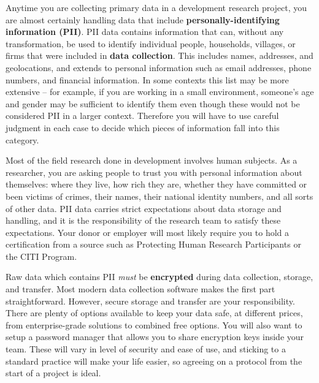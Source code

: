 Anytime you are collecting primary data in a development research project,
you are almost certainly handling data that include \textbf{personally-identifying information (PII)}.
PII data contains information that can, without any transformation, be used to identify
individual people, households, villages, or firms that were included in \textbf{data collection}.
This includes names, addresses, and geolocations, and extends to personal information
such as email addresses, phone numbers, and financial information.
In some contexts this list may be more extensive --
for example, if you are working in a small environment,
someone's age and gender may be sufficient to identify them
even though these would not be considered PII in a larger context.
Therefore you will have to use careful judgment in each case
to decide which pieces of information fall into this category.

Most of the field research done in development involves human subjects.
As a researcher, you are asking people to trust you with personal information about themselves:
where they live, how rich they are, whether they have committed or been victims of crimes,
their names, their national identity numbers, and all sorts of other data.
PII data carries strict expectations about data storage and handling,
and it is the responsibility of the research team to satisfy these expectations.
Your donor or employer will most likely require you to hold a certification from a source
such as Protecting Human Research Participants
or the CITI Program.

Raw data which contains PII \textit{must} be \textbf{encrypted}
during data collection, storage, and transfer.
Most modern data collection software makes the first part straightforward.
However, secure storage and transfer are your responsibility.
There are plenty of options available to keep your data safe,
at different prices, from enterprise-grade solutions to combined free options.
You will also want to setup a password manager that allows you to share encryption keys inside your team.
These will vary in level of security and ease of use,
and sticking to a standard practice will make your life easier,
so agreeing on a protocol from the start of a project is ideal.


